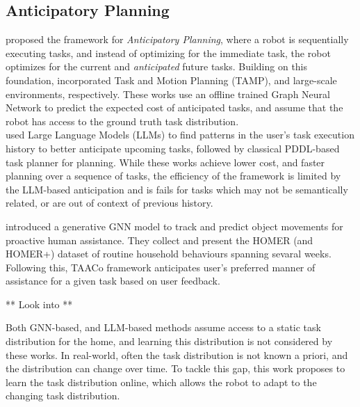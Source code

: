 \documentclass[10pt]{article} %
\begin{document}

\subsection{Anticipatory Planning}
\label{sec:ant_plan}

\cite{dhakal_anticipatory_2023} proposed the framework for \textit{Anticipatory Planning}, where a robot is sequentially executing tasks, and instead of optimizing for the immediate task, the robot optimizes for the current and \textit{anticipated} future tasks. 
Building on this foundation, \cite{dhakal_anticipatory_2024, talukder_anticipatory_2024} incorporated Task and Motion Planning (TAMP), and large-scale environments, respectively. 
These works use an offline trained Graph Neural Network to predict the expected cost of anticipated tasks, and assume that the robot has access to the ground truth task distribution. 
\\
\cite{arora_anticipate_2024, singh_anticipate_2024} used Large Language Models (LLMs) to find patterns in the user's task execution history to better anticipate upcoming tasks, followed by classical PDDL-based task planner for planning. While these works achieve lower cost, and faster planning over a sequence of tasks, the efficiency of the framework is limited by the LLM-based anticipation and is fails for tasks which may not be semantically related, or are out of context of previous history.

\cite{patel_proactive_nodate} introduced a generative GNN model to track and predict object movements for proactive human assistance. They collect and present the HOMER (and HOMER+\citep{patel_homer_plus}) dataset of routine household behaviours spanning sevaral weeks.
Following this, TAACo framework \citep{patel_robot_2025} anticipates user's preferred manner of assistance for a given task based on user feedback.

** Look into \citep{bouhsain_learning_2023}**

Both GNN-based, and LLM-based methods assume access to a static task distribution for the home, and learning this distribution is not considered by these works. In real-world, often the task distribution is not known a priori, and the distribution can change over time. To tackle this gap, this work proposes to learn the task distribution online, which allows the robot to adapt to the changing task distribution.
\end{document}
